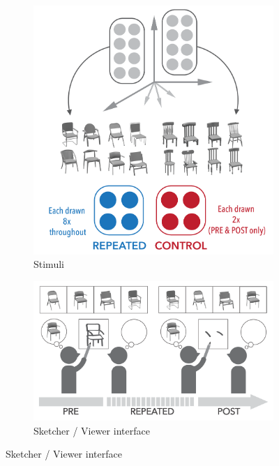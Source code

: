 \documentclass[10pt,letterpaper]{article}
\begin{document}
\begin{figure}
\begin{subfigure}{0.25\textwidth}
\includegraphics[width=\linewidth]{figures/stimuli.pdf}
\caption{Stimuli} \label{fig:1a}
\end{subfigure}

\begin{subfigure}{0.46\textwidth}
\includegraphics[width=\linewidth]{figures/task.pdf}
\caption{Sketcher / Viewer interface} \label{fig:1b}
\end{subfigure}
\end{figure}
\end{document}
